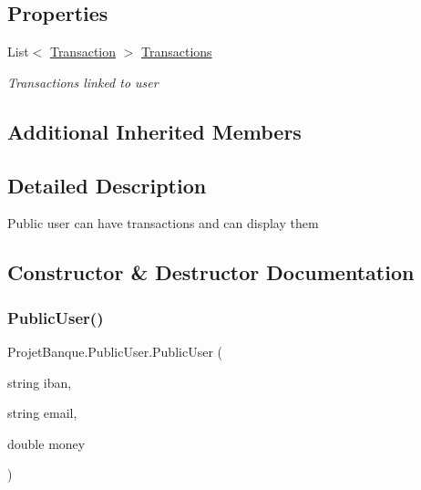 \subsection*{Properties}
\begin{DoxyCompactItemize}
\item 
List$<$ \mbox{\hyperlink{class_projet_banque_1_1_transaction}{Transaction}} $>$ \mbox{\hyperlink{class_projet_banque_1_1_public_user_aa31449261710729205d4999ad396384b}{Transactions}}
\begin{DoxyCompactList}\small\item\em Transactions linked to user \end{DoxyCompactList}\end{DoxyCompactItemize}
\subsection*{Additional Inherited Members}


\subsection{Detailed Description}
Public user can have transactions and can display them 



\subsection{Constructor \& Destructor Documentation}
\mbox{\label{class_projet_banque_1_1_public_user_adf4888fd1d26af87eb50f1c7beb0d212}} 
\subsubsection{\texorpdfstring{PublicUser()}{PublicUser()}}
{\footnotesize\ttfamily Projet\+Banque.\+Public\+User.\+Public\+User (\begin{DoxyParamCaption}\item[{string}]{iban,  }\item[{string}]{email,  }\item[{double}]{money }\end{DoxyParamCaption})}



